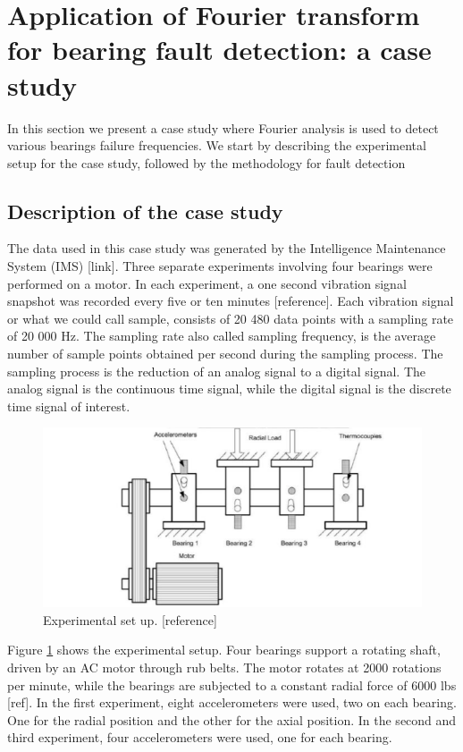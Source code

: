 \documentclass[../Main/thesis.tex]{subfiles}
\begin{document}

\section{Application of Fourier transform for bearing fault detection: a case study}
In this section we present a case study where Fourier analysis is used to detect various bearings failure frequencies. We start by describing the experimental setup for the case study, followed by the methodology for fault detection
\subsection{Description of the case study}
The data used in this case study was generated by the Intelligence Maintenance System (IMS) [link]. Three separate experiments involving four bearings were performed on a motor. In each experiment, a one second vibration signal snapshot was recorded every five or ten minutes [reference]. Each vibration signal or what we could call sample, consists of 20 480 data points with a sampling rate of 20 000 Hz.
\justify
The sampling rate also called sampling frequency, is the average number of sample points obtained per second during the sampling process. The sampling process is the reduction of an analog signal to a digital signal. The analog signal is the continuous time signal, while the digital signal is the discrete time signal of interest.
\begin{figure}[H] %
   \centering
   \includegraphics[width=8in]{../fig/experiment} 
   \caption{Experimental set up. [reference]}
   \label{fig:exp}
\end{figure}
\justify
Figure \ref{fig:exp} shows the experimental setup. Four bearings support a rotating shaft, driven by an AC motor through rub belts. The motor rotates at 2000 rotations per minute, while the bearings are subjected to a constant radial force of 6000 lbs [ref]. In the first experiment, eight accelerometers were used, two on each bearing. One for the radial position and the other for the axial position. In the second and third experiment, four accelerometers were used, one for each bearing.
\end{document}
